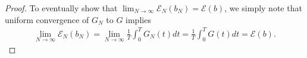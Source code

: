 \documentclass[A4paper,11pt]{article}
\theoremstyle{definition}
\newcommand{\N}{\mathbb{N}}
\newcommand{\R}{\mathbb{R}}
\begin{document}
\begin{proof}
	To eventually show that $\lim_{N \rightarrow \infty} \mathcal E_N( b_N) = \mathcal E( b)$, we simply note that uniform convergence of $G_N$ to $G$ implies 
	\begin{align*}
		\lim_{N \rightarrow \infty} \mathcal E_N( b_N) =  \lim_{N\rightarrow\infty} \frac{1}{T} \int^T_0 G_N(t) dt = \frac{1}{T} \int^T_0 G(t) dt = \mathcal E( b).
	\end{align*}
\end{proof}
\end{document}
